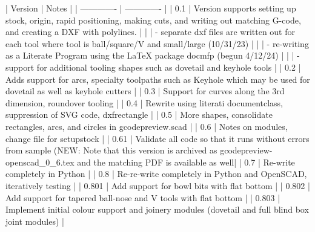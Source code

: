 \documentclass{ltxdoc}
\begin{document}
\begin{readme}
| Version       | Notes         |
| ------------- | ------------- |
| 0.1           | Version  supports setting up stock, origin, rapid positioning, making cuts, and writing out matching G-code, and creating a DXF with polylines.                                 |
|               |  - separate dxf files are written out for each tool where tool is ball/square/V and small/large (10/31/23)                                                                      |
|               |  - re-writing as a Literate Program using the LaTeX package docmfp (begun 4/12/24)                                                                                              |
|               |  - support for additional tooling shapes such as dovetail and keyhole tools                                                                                                     |
| 0.2           | Adds support for arcs, specialty toolpaths such as Keyhole which may be used for dovetail as well as keyhole cutters                                                            |
| 0.3           | Support for curves along the 3rd dimension, roundover tooling                                                                                                                   |
| 0.4           | Rewrite using literati documentclass, suppression of SVG code, dxfrectangle                                                                                                     |
| 0.5           | More shapes, consolidate rectangles, arcs, and circles in gcodepreview.scad                                                                                                     |
| 0.6           | Notes on modules, change file for setupstock                                                                                                                                    |
| 0.61          | Validate all code so that it runs without errors from sample (NEW: Note that this version is archived as gcodepreview-openscad_0_6.tex and the matching PDF is available as well|
| 0.7           | Re-write completely in Python                                                                                                                                                   |
| 0.8           | Re-re-write completely in Python and OpenSCAD, iteratively testing                                                                                                              |
| 0.801         | Add support for bowl bits with flat bottom                                                                                                                                      |
| 0.802         | Add support for tapered ball-nose and  V tools with flat bottom                                                                     |
| 0.803         | Implement initial colour support and joinery modules (dovetail and full blind box joint modules)                                                                                                                  |


\end{readme}
\end{document}
